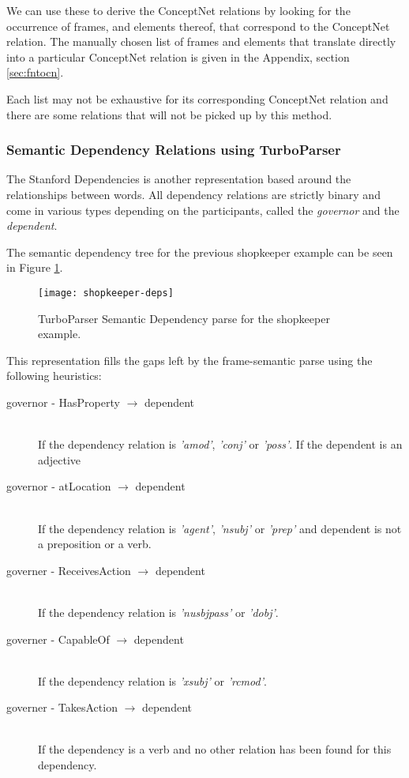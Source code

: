 We can use these to derive the ConceptNet relations by looking for the occurrence of frames, and elements thereof, that correspond to the ConceptNet relation. The manually chosen list of frames and elements that translate directly into a particular ConceptNet relation is given in the Appendix, section \ref{sec:fntocn}.

Each list may not be exhaustive for its corresponding ConceptNet relation and there are some relations that will not be picked up by this method.


\subsubsection{Semantic Dependency Relations using TurboParser}
\label{sec:turbo}

The Stanford Dependencies\cite{de2008stanford} is another representation based around the relationships between words. All dependency relations are strictly binary and come in various types depending on the participants, called the \textit{governor} and the \textit{dependent}.

The semantic dependency tree for the previous shopkeeper example can be seen in Figure \ref{fig:shopkeeper-deps}.

\begin{figure}[h!]
\centering
\texttt{[image: shopkeeper-deps]}
\caption{TurboParser Semantic Dependency parse for the shopkeeper example.}
\label{fig:shopkeeper-deps}
\end{figure}

This representation fills the gaps left by the frame-semantic parse using the following heuristics:

\begin{description}
\item[governor - HasProperty $\rightarrow$ dependent]  \hfill \\
If the dependency relation is \textit{'amod'}, \textit{'conj'} or \textit{'poss'}.
If the dependent is an adjective

\item[governor - atLocation $\rightarrow$ dependent] \hfill \\
If the dependency relation is \textit{'agent'}, \textit{'nsubj'} or \textit{'prep'}
	and dependent is not a preposition or a verb.
	
\item[governer - ReceivesAction $\rightarrow$ dependent] \hfill \\
If the dependency relation is \textit{'nusbjpass'} or \textit{'dobj'}.

\item[governer - CapableOf $\rightarrow$ dependent] \hfill \\
If the dependency relation is \textit{'xsubj'} or \textit{'rcmod'}.

\item[governer - TakesAction $\rightarrow$ dependent] \hfill \\
If the dependency is a verb and no other relation has been found for this dependency.
\end{description}

